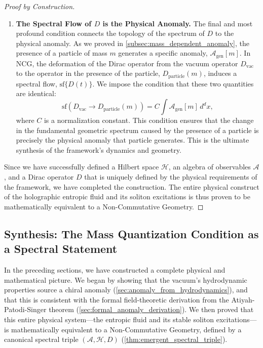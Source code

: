 \documentclass[11pt, letterpaper]{report}
\theoremstyle{plain} %
\theoremstyle{definition} %
\theoremstyle{remark} %
\begin{document}
\begin{proof}[Proof by Construction]
\begin{enumerate}
\begin{enumerate}[label=(\alph*)]
        \item \textbf{The Spectral Flow of $D$ is the Physical Anomaly.} The final and most profound condition connects the topology of the spectrum of $D$ to the physical anomaly. As we proved in \cref{subsec:mass_dependent_anomaly}, the presence of a particle of mass $m$ generates a specific anomaly, $\mathcal{A}_{\text{gen}}[m]$. In NCG, the deformation of the Dirac operator from the vacuum operator $D_{\text{vac}}$ to the operator in the presence of the particle, $D_{\text{particle}}(m)$, induces a spectral flow, $\text{sf}\{D(t)\}$. We impose the condition that these two quantities are identical:
        \begin{equation}
            \text{sf}(D_{\text{vac}} \to D_{\text{particle}}(m)) = C \int \mathcal{A}_{\text{gen}}[m] \, d^dx,
            \label{eq:spectral_flow_is_anomaly}
        \end{equation}
        where $C$ is a normalization constant. This condition ensures that the change in the fundamental geometric spectrum caused by the presence of a particle is precisely the physical anomaly that particle generates. This is the ultimate synthesis of the framework's dynamics and geometry.
    \end{enumerate}
\end{enumerate}
Since we have successfully defined a Hilbert space $\mathcal{H}$, an algebra of observables $\mathcal{A}$, and a Dirac operator $D$ that is uniquely defined by the physical requirements of the framework, we have completed the construction. The entire physical construct of the holographic entropic fluid and its soliton excitations is thus proven to be mathematically equivalent to a Non-Commutative Geometry.
\end{proof}


\subsection{Synthesis: The Mass Quantization Condition as a Spectral Statement}
\label{subsec:quantization_as_spectral_statement}

In the preceding sections, we have constructed a complete physical and mathematical picture. We began by showing that the vacuum's hydrodynamic properties source a chiral anomaly (\cref{sec:anomaly_from_hydrodynamics}), and that this is consistent with the formal field-theoretic derivation from the Atiyah-Patodi-Singer theorem (\cref{sec:formal_anomaly_derivation}). We then proved that this entire physical system—the entropic fluid and its stable soliton excitations—is mathematically equivalent to a Non-Commutative Geometry, defined by a canonical spectral triple $(\mathcal{A}, \mathcal{H}, D)$ (\cref{thm:emergent_spectral_triple}).
\end{document}
